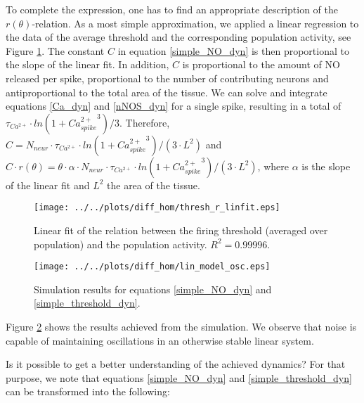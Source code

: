 \documentclass[10pt,a4paper]{article}
\begin{document}
To complete the expression, one has to find an appropriate description of the $r(\theta)$-relation. As a most simple approximation, we applied a linear regression to the data of the average threshold and the corresponding population activity, see Figure \ref{thresh_r_linfit}. The constant $C$ in equation \eqref{simple_NO_dyn} is then proportional to the slope of the linear fit. In addition, $C$ is proportional to the amount of NO released per spike, proportional to the number of contributing neurons and antiproportional to the total area of the tissue. We can solve and integrate equations \eqref{Ca_dyn} and \eqref{nNOS_dyn} for a single spike, resulting in a total of $\tau_{Ca^{2+}}\cdot ln(1+{Ca^{2+}_{spike}}^3) / 3$. Therefore, $C=N_{neur}\cdot \tau_{Ca^{2+}}\cdot ln(1+{Ca^{2+}_{spike}}^3) / (3\cdot L^2)$ and $C\cdot r(\theta)=\theta \cdot \alpha \cdot N_{neur} \cdot \tau_{Ca^{2+}}\cdot ln(1+{Ca^{2+}_{spike}}^3) / (3\cdot L^2)$, where $\alpha$ is the slope of the linear fit and $L^2$ the area of the tissue.
\begin{figure}
\texttt{[image: ../../plots/diff\_hom/thresh\_r\_linfit.eps]}
\caption{Linear fit of the relation between the firing threshold (averaged over population) and the population activity. $R^2=0.99996$.}
\label{thresh_r_linfit}
\end{figure}
\begin{figure}
\texttt{[image: ../../plots/diff\_hom/lin\_model\_osc.eps]}
\caption{Simulation results for equations \eqref{simple_NO_dyn} and \eqref{simple_threshold_dyn}.}
\label{lin_mod_osc}
\end{figure}
Figure \ref{lin_mod_osc} shows the results achieved from the simulation. We observe that noise is capable of maintaining oscillations in an otherwise stable linear system.

Is it possible to get a better understanding of the achieved dynamics? For that purpose, we note that equations \eqref{simple_NO_dyn} and \eqref{simple_threshold_dyn} can be transformed into the following:
\end{document}
